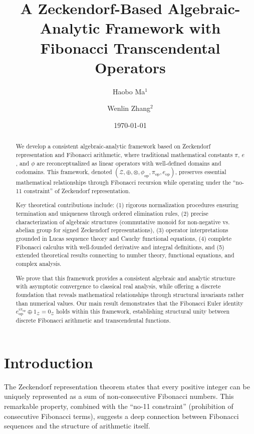 \documentclass[12pt]{article}
\title{A Zeckendorf-Based Algebraic-Analytic Framework with Fibonacci Transcendental Operators}
\author{Haobo Ma$^1$ \and Wenlin Zhang$^2$}
\date{\today}
\theoremstyle{plain}
\theoremstyle{definition}
\begin{document}
\maketitle

\begin{abstract}
We develop a consistent algebraic-analytic framework based on Zeckendorf representation and Fibonacci arithmetic, where traditional mathematical constants $\pi$, $e$, and $\phi$ are reconceptualized as linear operators with well-defined domains and codomains. This framework, denoted $(\mathcal{Z}, \oplus, \otimes, \phi_{\text{op}}, \pi_{\text{op}}, e_{\text{op}})$, preserves essential mathematical relationships through Fibonacci recursion while operating under the ``no-11 constraint'' of Zeckendorf representation. 

Key theoretical contributions include: (1) rigorous normalization procedures ensuring termination and uniqueness through ordered elimination rules, (2) precise characterization of algebraic structures (commutative monoid for non-negative vs. abelian group for signed Zeckendorf representations), (3) operator interpretations grounded in Lucas sequence theory and Cauchy functional equations, (4) complete Fibonacci calculus with well-founded derivative and integral definitions, and (5) extended theoretical results connecting to number theory, functional equations, and complex analysis.

We prove that this framework provides a consistent algebraic and analytic structure with asymptotic convergence to classical real analysis, while offering a discrete foundation that reveals mathematical relationships through structural invariants rather than numerical values. Our main result demonstrates that the Fibonacci Euler identity $e_{\text{op}}^{i\pi_{\text{op}}} \oplus 1_{\mathcal{Z}} = 0_{\mathcal{Z}}$ holds within this framework, establishing structural unity between discrete Fibonacci arithmetic and transcendental functions.
\end{abstract}

\section{Introduction}

The Zeckendorf representation theorem states that every positive integer can be uniquely represented as a sum of non-consecutive Fibonacci numbers. This remarkable property, combined with the ``no-11 constraint'' (prohibition of consecutive Fibonacci terms), suggests a deep connection between Fibonacci sequences and the structure of arithmetic itself.
\end{document}
